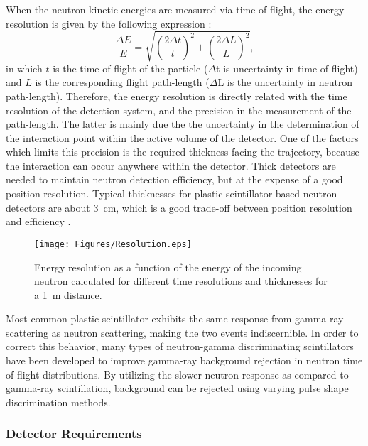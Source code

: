 \documentclass[preprint,3p,twocolumn]{elsarticle}
\begin{document}
When the neutron kinetic energies are measured via time-of-flight, the energy resolution is given by the following expression \cite{KORNILOV2009226}:
\begin{equation}
\frac{\Delta E}{E}=\sqrt{\left(\frac{2\Delta t}{t}\right )^2+\left(\frac{2\Delta L}{L}\right )^2},
\label{eq:resolution}
\end{equation}
in which $t$  is the time-of-flight of the particle ($\Delta$t is uncertainty in time-of-flight) and $L$ is the corresponding flight path-length ($\Delta$L is the uncertainty in neutron path-length). Therefore, the energy resolution is directly related with the time resolution of the detection system, and the precision in the measurement of the path-length. The latter is mainly due the the uncertainty in the determination of the interaction point within the active volume of the detector. One of the factors which limits this precision is the required thickness facing the trajectory, because the interaction can occur anywhere within the detector. Thick detectors are needed to maintain neutron detection efficiency, but at the expense of a good position resolution. Typical thicknesses for plastic-scintillator-based neutron detectors are about 3~cm, which is a good trade-off between position resolution and efficiency \cite{PETERS2016122,BUTA2000412}.
\begin{figure}[tp]
\centering
\texttt{[image: Figures/Resolution.eps]}
\caption{Energy resolution as a function of the energy of the incoming neutron calculated for different time resolutions and thicknesses for a 1~m distance.}
\label{fig:resolution}
\end{figure}


Most common plastic scintillator exhibits the same response from gamma-ray scattering as neutron scattering, making the two events indiscernible. In order to correct this behavior, many types of neutron-gamma discriminating scintillators have been developed to improve gamma-ray background rejection in neutron time of flight distributions. By utilizing the slower neutron response as compared to gamma-ray scintillation, background can be rejected using varying pulse shape discrimination methods.

\subsubsection{Detector Requirements}
\end{document}
